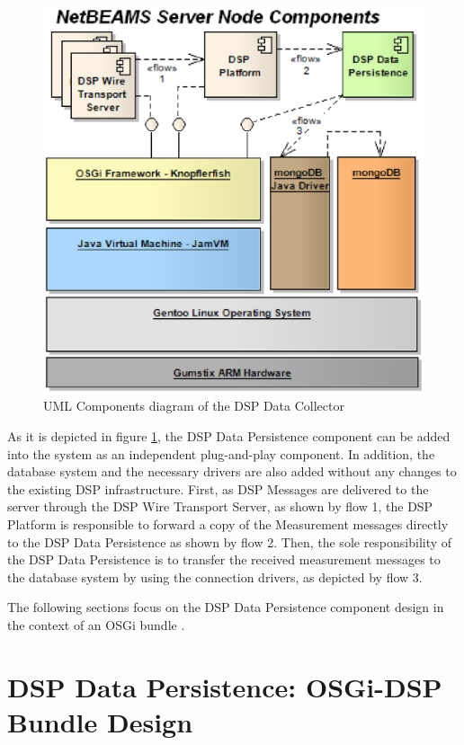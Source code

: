 \begin{figure}[!b]
  \centering
  \includegraphics[scale=0.5]{../diagrams/NetBEAMS-Persistence-Server-Node-Components}
  \caption{UML Components diagram of the DSP Data Collector}
  \label{fig:NetBEAMS-Persistence-Server-Node-Components}
\end{figure}

As it is depicted in figure
\ref{fig:NetBEAMS-Persistence-Server-Node-Components}, the DSP Data
Persistence component can be added into the system as an independent
plug-and-play component. In addition, the database system and the necessary
drivers are also added without any changes to the existing DSP infrastructure.
First, as DSP Messages are delivered to the server through the DSP Wire
Transport Server, as shown by flow 1, the DSP Platform is responsible to
forward a copy of the Measurement messages directly to the DSP Data
Persistence as shown by flow 2. Then, the sole responsibility of the DSP Data
Persistence is to transfer the received measurement messages to the database
system by using the connection drivers, as depicted by flow 3.

The following sections focus on the DSP Data Persistence component design in
the context of an OSGi bundle \cite{osgi}.

\section{DSP Data Persistence: OSGi-DSP Bundle Design}

